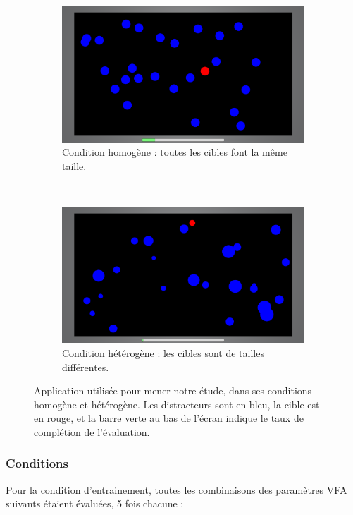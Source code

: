 	\begin{figure}[htbp]
		\begin{subfigure}[t]{0.49\textwidth}
			\centering
			\includegraphics[width=\textwidth]{figures/ch5/homoRunning}
			\caption{Condition homogène : toutes les cibles font la même taille.}
			\label{fig:homoRunning}
		\end{subfigure}
		~
		\begin{subfigure}[t]{0.49\textwidth}
			\centering
			\includegraphics[width=\textwidth]{figures/ch5/heteroRunning}
			\caption{Condition hétérogène : les cibles sont de tailles différentes.}
			\label{fig:heteroRunning}
		\end{subfigure}
		\caption[Application pour l'évaluation, homogène vs. hétérogène]{Application utilisée pour mener notre étude, dans ses conditions homogène et hétérogène. Les distracteurs sont en bleu, la cible est en rouge, et la barre verte au bas de l'écran indique le taux de complétion de l'évaluation.}
		\label{fig:evalAppRunning}
	\end{figure}
	
	\subsubsection{Conditions}
	Pour la condition d'entrainement, toutes les combinaisons des paramètres VFA suivants étaient évaluées, 5 fois chacune :
	
